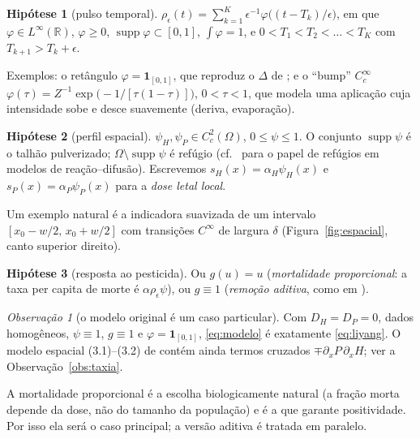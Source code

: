 \documentclass[11pt,a4paper]{article}
\numberwithin{equation}{section}
\theoremstyle{definition}
\newtheorem{hipotese}{Hipótese}
\theoremstyle{remark}
\newtheorem{observacao}[teorema]{Observação}
\newcommand{\R}{\mathbb{R}}
\begin{document}
\begin{hipotese}[pulso temporal]\label{A1}
$\rho_\epsilon(t)=\sum_{k=1}^{K}\epsilon^{-1}\varphi\big((t-T_k)/\epsilon\big)$, em que
$\varphi\in L^\infty(\R)$, $\varphi\ge0$, $\operatorname{supp}\varphi\subset[0,1]$,
$\int\varphi=1$, e $0<T_1<T_2<\dots<T_K$ com $T_{k+1}>T_k+\epsilon$.
\end{hipotese}

Exemplos: o retângulo $\varphi=\mathbf 1_{[0,1]}$, que reproduz o $\Delta$ de \cite{LiYang};
e o ``bump'' $C^\infty_c$
$\varphi(\tau)=Z^{-1}\exp\!\big(-1/[\tau(1-\tau)]\big)$, $0<\tau<1$, que modela uma
aplicação cuja intensidade sobe e desce suavemente (deriva, evaporação).

\begin{hipotese}[perfil espacial]\label{A2}
$\psi_H,\psi_P\in C^2_c(\Omega)$, $0\le\psi\le1$. O conjunto
$\operatorname{supp}\psi$ é o talhão pulverizado; $\Omega\setminus\operatorname{supp}\psi$
é refúgio (cf.\ \cite{CantrellCosner} para o papel de refúgios em modelos de reação--difusão). Escrevemos $s_H(x)=\alpha_H\psi_H(x)$ e $s_P(x)=\alpha_P\psi_P(x)$ para a
\emph{dose letal local}.
\end{hipotese}

Um exemplo natural é a indicadora suavizada de um intervalo
$[x_0-w/2,\,x_0+w/2]$ com transições $C^\infty$ de largura $\delta$
(Figura~\ref{fig:espacial}, canto superior direito).

\begin{hipotese}[resposta ao pesticida]\label{A3}
Ou $g(u)=u$ (\emph{mortalidade proporcional}: a taxa per capita de morte é
$\alpha\rho_\epsilon\psi$), ou $g\equiv1$ (\emph{remoção aditiva}, como em \cite{LiYang}).
\end{hipotese}

\begin{observacao}[o modelo original é um caso particular]
Com $D_H=D_P=0$, dados homogêneos, $\psi\equiv1$, $g\equiv1$ e
$\varphi=\mathbf 1_{[0,1]}$, \eqref{eq:modelo} é exatamente \eqref{eq:liyang}.
O modelo espacial (3.1)--(3.2) de \cite{LiYang} contém ainda termos cruzados
$\mp\partial_xP\,\partial_xH$; ver a Observação~\ref{obs:taxia}.
\end{observacao}

A mortalidade proporcional é a escolha biologicamente natural (a fração morta
depende da dose, não do tamanho da população) e é a que garante positividade.
Por isso ela será o caso principal; a versão aditiva é tratada em paralelo.

\end{document}

